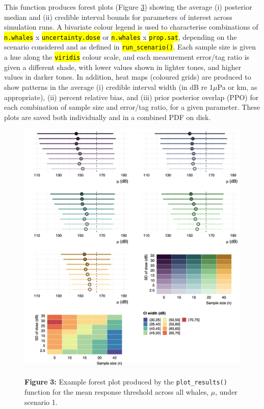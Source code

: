\documentclass[
]{article}
\begin{document}
This function produces forest plots (Figure \hyperlink{fig3}{3}) showing the average (i) posterior median and (ii) credible interval bounds for parameters of interest across simulation runs. A bivariate colour legend is used to characterise combinations of \textcolor{codecolor}{\texttt{\hl{n.whales}}} x \textcolor{codecolor}{\texttt{\hl{uncertainty.dose}}} or \textcolor{codecolor}{\texttt{\hl{n.whales}}} x \textcolor{codecolor}{\texttt{\hl{prop.sat}}}, depending on the scenario considered and as defined in \textcolor{codecolor}{\texttt{\hl{run\_scenario()}}}. Each sample size is given a hue along the \textcolor{codecolor}{\texttt{\hl{viridis}}} colour scale, and each measurement error/tag ratio is given a different shade, with lower values shown in lighter tones, and higher values in darker tones. In addition, heat maps (coloured grids) are produced to show patterns in the average (i) credible interval width (in dB re 1\(\mu\)Pa or km, as appropriate), (ii) percent relative bias, and (iii) prior posterior overlap (PPO) for each combination of sample size and error/tag ratio, for a given parameter. These plots are saved both individually and in a combined PDF on disk.



\begin{figure}

{\centering \includegraphics[width=0.8\linewidth]{fig/fig_forestplot_mu} 

}

\textbf{Figure }{\textbf{3:} \hypertarget{fig3}{}Example forest plot produced by the \texttt{plot\_results()} function for the mean response threshold across all whales, \(\mu\), under scenario 1.}\label{fig:unnamed-chunk-7}
\end{figure}
\end{document}
